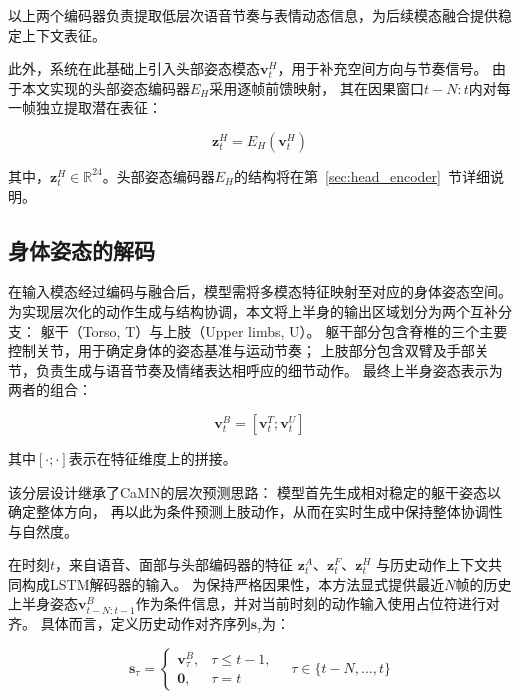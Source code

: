 以上两个编码器负责提取低层次语音节奏与表情动态信息，为后续模态融合提供稳定上下文表征。

此外，系统在此基础上引入头部姿态模态$\bm{v}^{H}_t$，用于补充空间方向与节奏信号。
由于本文实现的头部姿态编码器$E_H$采用逐帧前馈映射，
其在因果窗口$t\!-\!N:t$内对每一帧独立提取潜在表征：

\begin{equation}
\bm{z}^{H}_t = E_H(\bm{v}^{H}_t)
\label{eq:head_pose_framewise_encode}
\end{equation}

其中，$\bm{z}^{H}_t \in \mathbb R^{24}$。头部姿态编码器$E_H$的结构将在第~\ref{sec:head_encoder}~节详细说明。

\subsection{身体姿态的解码}
\label{subsec:output_modality_decoding}

在输入模态经过编码与融合后，模型需将多模态特征映射至对应的身体姿态空间。
为实现层次化的动作生成与结构协调，本文将上半身的输出区域划分为两个互补分支：
躯干（Torso, T）与上肢（Upper limbs, U）。
躯干部分包含脊椎的三个主要控制关节，用于确定身体的姿态基准与运动节奏；
上肢部分包含双臂及手部关节，负责生成与语音节奏及情绪表达相呼应的细节动作。
最终上半身姿态表示为两者的组合：

\begin{equation}
\bm{v}_t^{B} = [\bm{v}_t^{T}; \bm{v}_t^{U}]
\label{eq:body_vector_concat}
\end{equation}

其中$[\cdot;\cdot]$表示在特征维度上的拼接。

该分层设计继承了CaMN的层次预测思路：
模型首先生成相对稳定的躯干姿态以确定整体方向，
再以此为条件预测上肢动作，从而在实时生成中保持整体协调性与自然度。

在时刻$t$，来自语音、面部与头部编码器的特征
$\bm{z}_t^{A}$、$\bm{z}_t^{F}$、$\bm{z}_t^{H}$
与历史动作上下文共同构成LSTM解码器的输入。
为保持严格因果性，本方法显式提供最近$N$帧的历史上半身姿态$\bm{v}_{t-N:t-1}^{B}$作为条件信息，并对当前时刻的动作输入使用占位符进行对齐。
具体而言，定义历史动作对齐序列$\bm{s}_\tau$为：

\begin{equation}
\bm{s}_\tau =
\begin{cases}
\bm{v}_\tau^{B}, & \tau \le t-1, \\
\mathbf{0}, & \tau = t
\end{cases}
\quad \tau \in \{t-N,\ldots,t\}
\label{eq:history_padding}
\end{equation}


